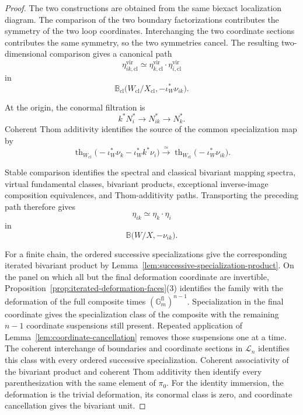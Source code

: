 \begin{proof}
The two constructions are obtained from the same biexact localization
diagram.  The comparison of the two boundary factorizations contributes
the symmetry of the two loop coordinates.  Interchanging the two
coordinate sections contributes the same symmetry, so the two symmetries
cancel.  The resulting two-dimensional comparison gives a canonical path
\[
    \eta^{\mathrm{vir}}_{ik,\mathrm{cl}}
    \simeq
    \eta^{\mathrm{vir}}_{k,\mathrm{cl}}
    \cdot
    \eta^{\mathrm{vir}}_{i,\mathrm{cl}}
\]
in
\[
    \mathbb B_{\mathrm{cl}}
    \bigl(
      W_{\mathrm{cl}}/X_{\mathrm{cl}},
      -\iota_W^*\nu_{ik}
    \bigr).
\]

At the origin, the conormal filtration is
\[
    k^*N_i^*
    \longrightarrow
    N_{ik}^*
    \longrightarrow
    N_k^*.
\]
Coherent Thom additivity identifies the source of the common specialization
map by
\[
    \operatorname{th}_{W_{\mathrm{cl}}}
    \bigl(
      -\iota_W^*\nu_k
      -
      \iota_W^*k^*\nu_i
    \bigr)
    \xrightarrow{\simeq}
    \operatorname{th}_{W_{\mathrm{cl}}}
    \bigl(
      -\iota_W^*\nu_{ik}
    \bigr).
\]

Stable comparison identifies the spectral and classical bivariant mapping
spectra, virtual fundamental classes, bivariant products, exceptional
inverse-image composition equivalences, and Thom-additivity paths.
Transporting the preceding path therefore gives
\[
    \eta_{ik}
    \simeq
    \eta_k\cdot\eta_i
\]
in
\[
    \mathbb B
    \bigl(
      W/X,
      -\nu_{ik}
    \bigr).
\]

For a finite chain, the ordered successive specializations give the
corresponding iterated bivariant product by
Lemma~\ref{lem:successive-specialization-product}.  On the panel on which
all but the final deformation coordinate are invertible,
Proposition~\ref{prop:iterated-deformation-faces}(3) identifies the family
with the deformation of the full composite times
\((\mathbb G_m^{\mathrm{fl}})^{n-1}\).  Specialization in the final
coordinate gives the specialization class of the composite with the
remaining \(n-1\) coordinate suspensions still present.  Repeated
application of Lemma~\ref{lem:coordinate-cancellation} removes those
suspensions one at a time.  The coherent interchange of boundaries and
coordinate sections in \(\mathcal L_n\) identifies this class with every
ordered successive specialization.  Coherent associativity of the
bivariant product and coherent Thom additivity then identify every
parenthesization with the same element of \(\pi_0\).  For the identity
immersion, the deformation is the trivial deformation, its conormal class
is zero, and coordinate cancellation gives the bivariant unit.
\end{proof}

